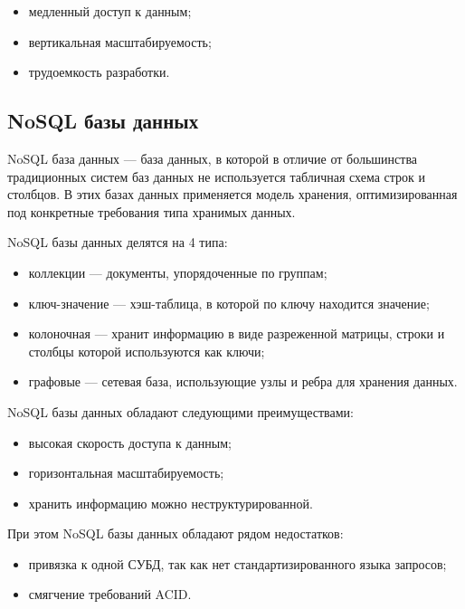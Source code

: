 \begin{itemize}
    \item медленный доступ к данным;
    \item вертикальная масштабируемость;
    \item трудоемкость разработки.
\end{itemize}


\subsection{NoSQL базы данных}

NoSQL база данных \cite{db-nosql} --- база данных, в которой в отличие от большинства традиционных систем баз данных не используется табличная схема строк и столбцов. В этих базах данных применяется модель хранения, оптимизированная под конкретные требования типа хранимых данных.

NoSQL базы данных делятся на 4 типа:

\begin{itemize}
    \item коллекции --- документы, упорядоченные по группам;
    \item ключ-значение --- хэш-таблица, в которой по ключу находится значение;
    \item колоночная --- хранит информацию в виде разреженной матрицы, строки и столбцы которой используются как ключи;
    \item графовые --- сетевая база, использующие узлы и ребра для хранения данных.
\end{itemize}

NoSQL базы данных обладают следующими преимуществами:

\begin{itemize}
    \item высокая скорость доступа к данным;
    \item горизонтальная масштабируемость;
    \item хранить информацию можно неструктурированной.
\end{itemize}

При этом NoSQL базы данных обладают рядом недостатков:

\begin{itemize}
    \item привязка к одной СУБД, так как нет стандартизированного языка запросов;
    \item смягчение требований ACID.
\end{itemize}


